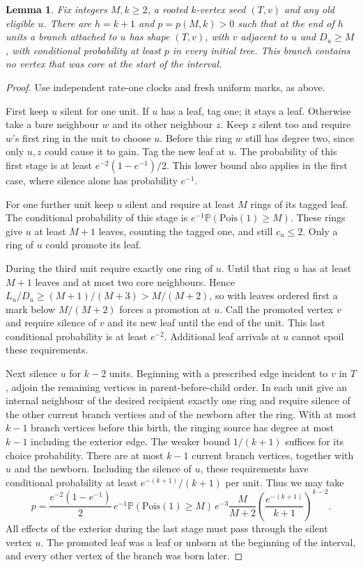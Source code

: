 \documentclass[11pt]{article}
\newtheorem{lemma}{Lemma}[section]
\theoremstyle{remark}
\numberwithin{equation}{section}
\newcommand{\Prob}{\mathbb P}
\begin{document}
\begin{lemma}\label{lem:plant} Fix integers $M,k\ge2$, a rooted $k$-vertex seed $(T,v)$ and any old eligible $u$. There are $h=k+1$ and $p=p(M,k)>0$ such that at the end of $h$ units a branch attached to $u$ has shape $(T,v)$, with $v$ adjacent to $u$ and $D_u\ge M$, with conditional probability at least $p$ in every initial tree. This branch contains no vertex that was core at the start of the interval.
\end{lemma}
\begin{proof} Use independent rate-one clocks and fresh uniform marks, as above.

First keep $u$ silent for one unit. If $u$ has a leaf, tag one; it stays a leaf. Otherwise take a bare neighbour $w$ and its other neighbour $z$. Keep $z$ silent too and require $w$'s first ring in the unit to choose $u$. Before this ring $w$ still has degree two, since only $u,z$ could cause it to gain. Tag the new leaf at $u$. The probability of this first stage is at least $e^{-2}(1-e^{-1})/2$. This lower bound also applies in the first case, where silence alone has probability $e^{-1}$.

For one further unit keep $u$ silent and require at least $M$ rings of its tagged leaf. The conditional probability of this stage is $e^{-1}\Prob(\mathrm{Pois}(1)\ge M)$. These rings give $u$ at least $M+1$ leaves, counting the tagged one, and still $c_u\le2$. Only a ring of $u$ could promote its leaf.

During the third unit require exactly one ring of $u$. Until that ring $u$ has at least $M+1$ leaves and at most two core neighbours. Hence $L_u/D_u\ge(M+1)/(M+3)>M/(M+2)$, so with leaves ordered first a mark below $M/(M+2)$ forces a promotion at $u$. Call the promoted vertex $v$ and require silence of $v$ and its new leaf until the end of the unit. This last conditional probability is at least $e^{-2}$. Additional leaf arrivals at $u$ cannot spoil these requirements.

Next silence $u$ for $k-2$ units. Beginning with a prescribed edge incident to $v$ in $T$, adjoin the remaining vertices in parent-before-child order. In each unit give an internal neighbour of the desired recipient exactly one ring and require silence of the other current branch vertices and of the newborn after the ring. With at most $k-1$ branch vertices before this birth, the ringing source has degree at most $k-1$ including the exterior edge. The weaker bound $1/(k+1)$ suffices for its choice probability. There are at most $k-1$ current branch vertices, together with $u$ and the newborn. Including the silence of $u$, these requirements have conditional probability at least $e^{-(k+1)}/(k+1)$ per unit. Thus we may take
\[
p=\frac{e^{-2}(1-e^{-1})}{2}\,e^{-1}\Prob(\mathrm{Pois}(1)\ge M)
   \, e^{-3}\frac{M}{M+2}
    \left(\frac{e^{-(k+1)}}{k+1}\right)^{k-2}.
\] All effects of the exterior during the last stage must pass through the silent vertex $u$. The promoted leaf was a leaf or unborn at the beginning of the interval, and every other vertex of the branch was born later.\end{proof}
\end{document}
